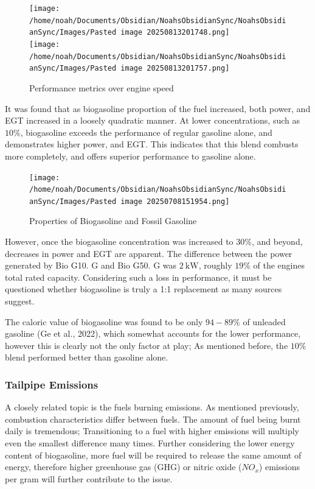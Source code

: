\documentclass[10pt,a4paper]{article}
\begin{document}
\begin{figure}[h]
	\centering
		\texttt{[image: /home/noah/Documents/Obsidian/NoahsObsidianSync/NoahsObsidianSync/Images/Pasted image 20250813201748.png]}\\
		\texttt{[image: /home/noah/Documents/Obsidian/NoahsObsidianSync/NoahsObsidianSync/Images/Pasted image 20250813201757.png]}\\
		\caption{Performance metrics over engine speed}
\end{figure}


	
	It was found that as biogasoline proportion of the fuel increased, both
	power, and EGT increased in a loosely quadratic manner. At lower
	concentrations, such as $10\%$, biogasoline exceeds the performance of
	regular gasoline alone, and demonstrates higher power, and EGT. This
	indicates that this blend combusts more completely, and offers superior
	performance to gasoline alone.\newpage
	
	\begin{figure}[h!]
		\centering
		\texttt{[image: /home/noah/Documents/Obsidian/NoahsObsidianSync/NoahsObsidianSync/Images/Pasted image 20250708151954.png]}\\
		\caption{Properties of Biogasoline and Fossil Gasoline}
	\end{figure}
	
	However, once the biogasoline concentration was increased to $30\%$, and
	beyond, decreases in power and EGT are apparent. The difference between
	the power generated by Bio G10. G and Bio G50. G was $2\ \mathrm{kW}$, roughly $19\%$ of the engines total rated capacity. Considering such a loss in performance, it must be questioned whether biogasoline is truly a 1:1 replacement as many sources suggest. 
	

	
	The caloric value of biogasoline was found to be only $94-89\%$ of
	unleaded gasoline 	(Ge et al., 2022), which somewhat accounts for the lower performance,
	however this is clearly not the only factor at play; As mentioned
	before, the $10\%$ blend performed better than gasoline alone. 
	
	\subsubsection{Tailpipe Emissions}\label{burning-emissions}
	
	A closely related topic is the fuel\textquotesingle s burning emissions.
	As mentioned previously, combustion characteristics differ between
	fuels. The amount of fuel being burnt daily is tremendous; Transitioning
	to a fuel with higher emissions will multiply even the smallest
	difference many times. Further considering the lower energy content of
	biogasoline, more fuel will be required to release the same amount of
	energy, therefore higher greenhouse gas (GHG) or nitric oxide ($NO_x$)
	emissions per gram will further contribute to the issue. 
	
\end{document}
